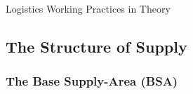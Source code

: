 \documentclass[noraggedright]{turabian-researchpaper}
\begin{document}




	{Logistics Working Practices in Theory}

	



	\subsection{The Structure of Supply}
		

		\subsubsection{The Base Supply-Area (BSA)}



\end{document}

